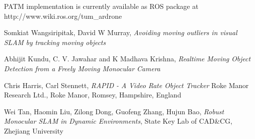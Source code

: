 \documentclass[11pt]{article}
\begin{document}
\begin{thebibliography}{9}
        PATM implementation is currently available as ROS package at \\
        http://www.wiki.ros.org/tum\_ardrone
        
        Somkiat Wangsiripitak, David W Murray, \emph{Avoiding moving outliers in visual SLAM by tracking moving objects}
        
        Abhijit Kundu, C. V. Jawahar and K Madhava Krishna, \emph{Realtime Moving Object Detection from a Freely Moving Monocular Camera}
    
        Chris Harris, Carl Stennett, \emph{RAPID - A Video Rate Object Tracker} Roke Manor Research Ltd., Roke Manor, Romsey, Hampshire, England
    
        Wei Tan, Haomin Liu, Zilong Dong, Guofeng Zhang, Hujun Bao, \emph{Robust Monocular SLAM in Dynamic Environments}, State Key Lab of CAD\&CG, Zhejiang University

    \end{thebibliography}
\end{document}
